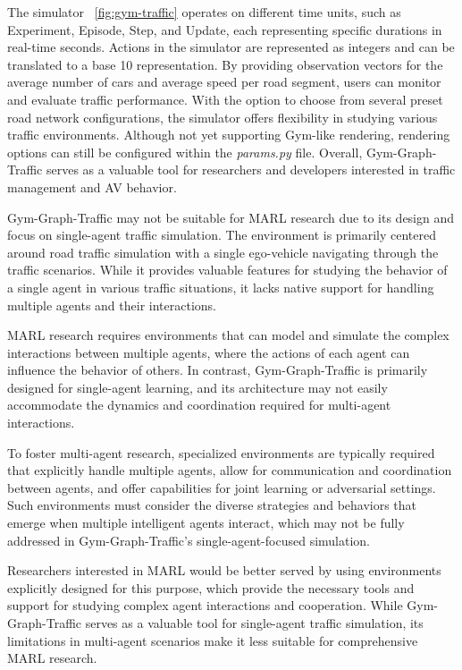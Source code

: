 The simulator ~\cref{fig:gym-traffic} operates on different time units, such as Experiment, Episode, Step, and Update, each representing specific durations in real-time seconds. Actions in the simulator are represented as integers and can be translated to a base 10 representation. By providing observation vectors for the average number of cars and average speed per road segment, users can monitor and evaluate traffic performance. With the option to choose from several preset road network configurations, the simulator offers flexibility in studying various traffic environments. Although not yet supporting Gym-like rendering, rendering options can still be configured within the \emph{params.py} file. Overall, Gym-Graph-Traffic serves as a valuable tool for researchers and developers interested in traffic management and AV behavior.

Gym-Graph-Traffic may not be suitable for MARL research due to its design and focus on single-agent traffic simulation. The environment is primarily centered around road traffic simulation with a single ego-vehicle navigating through the traffic scenarios. While it provides valuable features for studying the behavior of a single agent in various traffic situations, it lacks native support for handling multiple agents and their interactions.

MARL research requires environments that can model and simulate the complex interactions between multiple agents, where the actions of each agent can influence the behavior of others. In contrast, Gym-Graph-Traffic is primarily designed for single-agent learning, and its architecture may not easily accommodate the dynamics and coordination required for multi-agent interactions.

To foster multi-agent research, specialized environments are typically required that explicitly handle multiple agents, allow for communication and coordination between agents, and offer capabilities for joint learning or adversarial settings. Such environments must consider the diverse strategies and behaviors that emerge when multiple intelligent agents interact, which may not be fully addressed in Gym-Graph-Traffic's single-agent-focused simulation.

Researchers interested in MARL would be better served by using environments explicitly designed for this purpose, which provide the necessary tools and support for studying complex agent interactions and cooperation. While Gym-Graph-Traffic serves as a valuable tool for single-agent traffic simulation, its limitations in multi-agent scenarios make it less suitable for comprehensive MARL research.


